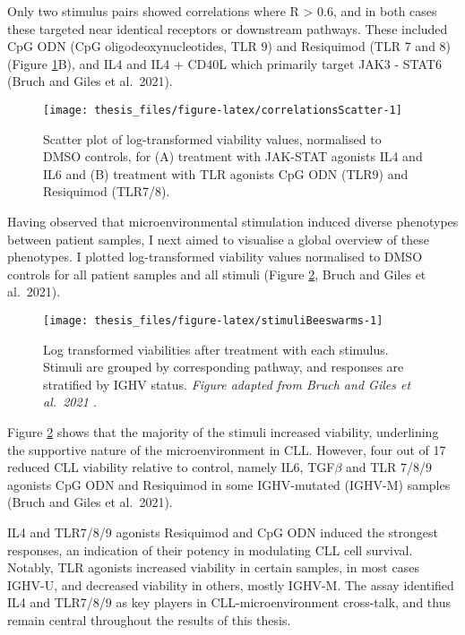 \documentclass[11pt, a4paper, twosided]{book}
\begin{document}
Only two stimulus pairs showed correlations where R \textgreater{} 0.6, and in both cases these targeted near identical receptors or downstream pathways. These included CpG ODN (CpG oligodeoxynucleotides, TLR 9) and Resiquimod (TLR 7 and 8) (Figure \ref{fig:correlationsScatter}B), and IL4 and IL4 + CD40L which primarily target JAK3 - STAT6 (Bruch and Giles et al.~2021).


\begin{figure}

{\centering \texttt{[image: thesis\_files/figure-latex/correlationsScatter-1]} 

}

\caption{Scatter plot of log-transformed viability values, normalised to DMSO controls, for (A) treatment with JAK-STAT agonists IL4 and IL6 and (B) treatment with TLR agonists CpG ODN (TLR9) and Resiquimod (TLR7/8).}\label{fig:correlationsScatter}
\end{figure}
Having observed that microenvironmental stimulation induced diverse phenotypes between patient samples, I next aimed to visualise a global overview of these phenotypes. I plotted log-transformed viability values normalised to DMSO controls for all patient samples and all stimuli (Figure \ref{fig:stimuliBeeswarms}, Bruch and Giles et al.~2021).


\begin{figure}

{\centering \texttt{[image: thesis\_files/figure-latex/stimuliBeeswarms-1]} 

}

\caption{Log transformed viabilities after treatment with each stimulus. Stimuli are grouped by corresponding pathway, and responses are stratified by IGHV status. \emph{Figure adapted from Bruch and Giles et al.~2021 .}}\label{fig:stimuliBeeswarms}
\end{figure}
Figure \ref{fig:stimuliBeeswarms} shows that the majority of the stimuli increased viability, underlining the supportive nature of the microenvironment in CLL. However, four out of 17 reduced CLL viability relative to control, namely IL6, TGF\(\beta\) and TLR 7/8/9 agonists CpG ODN and Resiquimod in some IGHV-mutated (IGHV-M) samples (Bruch and Giles et al.~2021).

IL4 and TLR7/8/9 agonists Resiquimod and CpG ODN induced the strongest responses, an indication of their potency in modulating CLL cell survival. Notably, TLR agonists increased viability in certain samples, in most cases IGHV-U, and decreased viability in others, mostly IGHV-M. The assay identified IL4 and TLR7/8/9 as key players in CLL-microenvironment cross-talk, and thus remain central throughout the results of this thesis.
\end{document}
